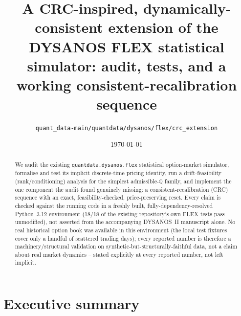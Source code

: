 \documentclass[11pt]{article}
\title{A CRC-inspired, dynamically-consistent extension of the\\
DYSANOS FLEX statistical simulator: audit, tests, and a\\
working consistent-recalibration sequence}
\author{\texttt{quant\_data-main/quantdata/dysanos/flex/crc\_extension}}
\date{\today}
\newcommand{\Q}{\mathbb Q}
\begin{document}
\maketitle

\begin{abstract}
We audit the existing \texttt{quantdata.dysanos.flex} statistical option-market
simulator, formalise and test its implicit discrete-time pricing identity, run a
drift-feasibility (rank/conditioning) analysis for the simplest admissible-$\Q$
family, and implement the one component the audit found genuinely missing: a
consistent-recalibration (CRC) sequence with an exact, feasibility-checked,
price-preserving reset. Every claim is checked against the running code in a
freshly built, fully-dependency-resolved Python~3.12 environment (18/18 of the
existing repository's own FLEX tests pass unmodified), not asserted from the
accompanying DYSANOS~II manuscript alone. No real historical option book was
available in this environment (the local test fixtures cover only a handful of
scattered trading days); every reported number is therefore a machinery/structural
validation on synthetic-but-structurally-faithful data, not a claim about real
market dynamics -- stated explicitly at every reported number, not left implicit.
\end{abstract}

\tableofcontents

\section{Executive summary}
\label{sec:exec}
\end{document}
